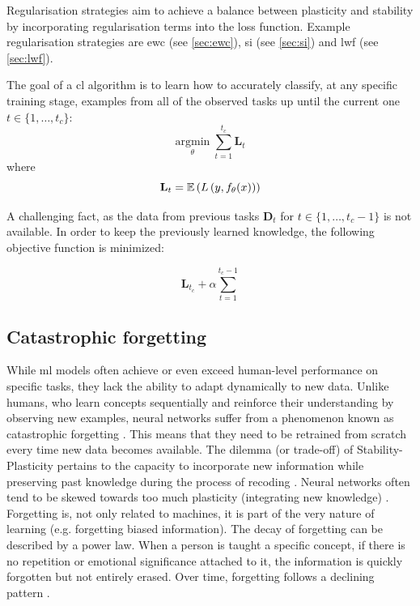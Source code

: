 Regularisation strategies aim to achieve a balance between plasticity and stability by incorporating regularisation terms into the loss function. Example regularisation strategies are \acrshort{ewc} (see \ref{sec:ewc}), \acrshort{si} (see \ref{sec:si}) and \acrshort{lwf} (see \ref{sec:lwf}). 

The goal of a \acrshort{cl} algorithm is to learn how to accurately classify, at any specific training stage, examples from all of the observed tasks up until the current one $t\in \{ 1, \dots, t_{c} \}$:
\[
    \underset{\theta}{\mathrm{argmin}} \; \sum^{t_{c}}_{t=1} \mathbf{L}_{t}
\]
where
\[
    \mathbf{L}_{t} = \operatorname{\mathbb{E}} \left( L \left( y, f_{\theta} (x) \right) \right)
\]

A challenging fact, as the data from previous tasks $\mathbf{D}_{t}$ for $t\in \{ 1, \dots, t_{c} - 1 \}$ is not available. 
In order to keep the previously learned knowledge, the following objective function is minimized:

\[
\mathbf{L}_{t_{c}} + \alpha \sum_{t=1}^{t_{c}-1}
\]

\subsection{Catastrophic forgetting}
\label{ref:subsub_catastrophic}
While \acrshort{ml} models often achieve or even exceed human-level performance on specific tasks, they lack the ability to adapt dynamically to new data. Unlike humans, who learn concepts sequentially and reinforce their understanding by observing new examples, neural networks suffer from a phenomenon known as catastrophic forgetting \citep{french1999catastrophic}. This means that they need to be retrained from scratch every time new data becomes available. 
The dilemma (or trade-off) of Stability-Plasticity pertains to the capacity to incorporate new information while preserving past knowledge during the process of recoding \citep{grossberg2012studies}. Neural networks often tend to be skewed towards too much plasticity (integrating new knowledge) \citep{de2021continual}. Forgetting is, not only related to machines, it is part of the very nature of learning (e.g. forgetting biased information). The decay of forgetting can be described by a power law. When a person is taught a specific concept, if there is no repetition or emotional significance attached to it, the information is quickly forgotten but not entirely erased. Over time, forgetting follows a declining pattern \citep{pashler2009predicting}.


